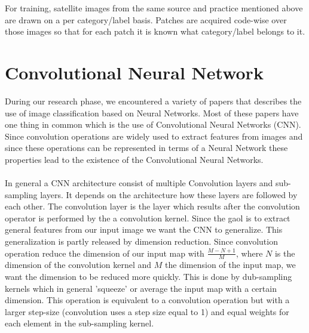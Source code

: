 \documentclass[a4paper,onecolumn]{report}
\begin{document}
For training, satellite images from the same source and practice mentioned above are drawn on a per category/label basis. Patches are acquired code-wise over those images so that for each patch it is known what category/label belongs to it.


\chapter{Convolutional Neural Network}
\label{chap:CNN}
During our research phase, we encountered a variety of papers that describes the use of image classification based on Neural Networks. Most of these papers have one thing in common which is the use of Convolutional Neural Networks (CNN). Since convolution operations are widely used to extract features from images and since these operations can be represented in terms of a Neural Network these properties lead to the existence of the Convolutional Neural Networks. 
\\\\
In general a CNN architecture consist of multiple Convolution layers and sub-sampling layers. It depends on the architecture how these layers are followed by each other. The convolution layer is the layer which results after the convolution operator is performed by the a convolution kernel. Since the gaol is to extract general features from our input image we want the CNN to generalize. This generalization is partly released by dimension reduction. Since convolution operation reduce the dimension of our input map with $\frac{M-N+1}{M}$, where $N$ is the dimension of the convolution kernel and $M$ the dimension of the input map, we want the dimension to be reduced more quickly. This is done by dub-sampling kernels which in general 'squeeze' or average the input map with a certain dimension. This operation is equivalent to a convolution operation but with a larger step-size (convolution uses a step size equal to 1) and equal weights for each element in the sub-sampling kernel.
\end{document}
